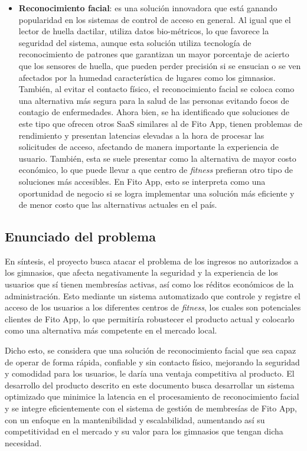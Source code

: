 \begin{itemize}
     \item \textbf{Reconocimiento facial}: es una solución innovadora que está ganando popularidad en los sistemas de control de acceso en general. Al igual que el lector de huella dactilar, utiliza datos bio-métricos, lo que favorece la seguridad del sistema, aunque esta solución utiliza tecnología de reconocimiento de patrones que garantizan un mayor porcentaje de acierto que los sensores de huella, que pueden perder precisión si se ensucian o se ven afectados por la humedad característica de lugares como los gimnasios. También, al evitar el contacto físico, el reconocimiento facial se coloca como una alternativa más segura para la salud de las personas evitando focos de contagio de enfermedades. Ahora bien, se ha identificado que soluciones de este tipo que ofrecen otros SaaS similares al de Fito App, tienen problemas de rendimiento y presentan latencias elevadas a la hora de procesar las solicitudes de acceso, afectando de manera importante la experiencia de usuario. También, esta se suele presentar como la alternativa de mayor costo económico, lo que puede llevar a que centro de \textit{fitness} prefieran otro tipo de soluciones más accesibles. En Fito App, esto se interpreta como una oportunidad de negocio si se logra implementar una solución más eficiente y de menor costo que las alternativas actuales en el país.

 \end{itemize}

 \subsection{Enunciado del problema}

En síntesis, el proyecto busca atacar el problema de los ingresos no autorizados a los gimnasios, que afecta negativamente la seguridad y la experiencia de los usuarios que sí tienen membresías activas, así como los réditos económicos de la administración. Esto mediante un sistema automatizado que controle y registre el acceso de los usuarios a los diferentes centros de \textit{fitness}, los cuales son potenciales clientes de Fito App, lo que permitiría robustecer el producto actual y colocarlo como una alternativa más competente en el mercado local. 

Dicho esto, se considera que una solución de reconocimiento facial que sea capaz de operar de forma rápida, confiable y sin contacto físico, mejorando la seguridad y comodidad para los usuarios, le daría una ventaja competitiva al producto. El desarrollo del producto descrito en este documento busca desarrollar un sistema optimizado que minimice la latencia en el procesamiento de reconocimiento facial y se integre eficientemente con el sistema de gestión de membresías de Fito App, con un enfoque en la mantenibilidad y escalabilidad, aumentando así su competitividad en el mercado y su valor para los gimnasios que tengan dicha necesidad.


